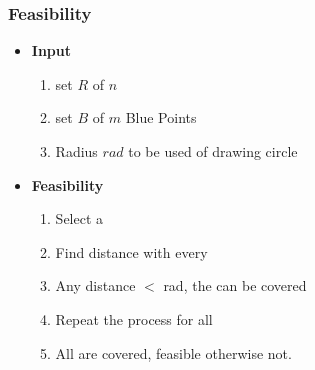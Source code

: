 \documentclass[blue]{beamer}
\begin{document}
\begin{frame}
 \frametitle{Feasibility}
  \begin{itemize}
  \item {\color{red}\textbf{{Input}}}
  \begin{enumerate}
      \item set $R$ of $n$ {\color{red}{Red Points}}
      \item set $B$ of $m$ {\color{blue} {Blue Points}}
      \item Radius $rad$ to be used of drawing circle
  \end{enumerate}
 \item {\color{red}\textbf{{Feasibility}}}
 \begin{enumerate}
  \item Select a {\color{red}{red point.}}
  \item Find distance with every {\color{blue}{blue point}}
  \item Any distance $<$ rad, the {\color{red}{red point}} can be covered
  \item Repeat the process for all {\color{red}{red point}}
  \item All {\color{red}{red point}} are covered, feasible otherwise not.
 \end{enumerate}
 \end{itemize}
 \end{frame}
\end{document}

